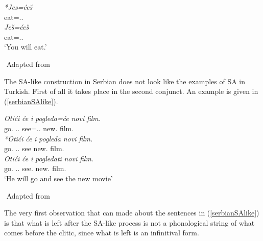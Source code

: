 \begin{exe}
    \ex \label{serbiance2}
    \begin{xlist}
        \ex 
        \gll 
        \textit{*Jes=\'{c}e\u{s}} \\ eat={\Aux}.{\Second}{\Sg}.{\Fut} \\
    
        \ex
        \gll 
        \textit{Je\u{s}=\'{c}e\u{s}} \\ eat={\Aux}.{\Second}{\Sg}.{\Fut} \\
        \glt `You will eat.'
    \end{xlist}
    ${}$ \hfill Adapted from \cite{despic2017suspended}
\end{exe}

The SA-like construction in Serbian does not look like the examples of SA in Turkish. First of all it takes place in the second conjunct. An example is given in (\ref{serbianSAlike}).

\begin{exe}
    \ex \label{serbianSAlike}
    \begin{xlist}
        \ex 
        \gll 
        \textit{Oti\'{c}i} \textit{\'{c}e} \textit{i} \textit{pogleda=\'{c}e} \textit{novi} \textit{film.} \\ go.{\Inf} {\Aux}.{\Third}{\Sg}.{\Fut} {\And} see={\Aux}.{\Third}{\Sg}.{\Fut} new.{\Acc} film.{\Acc} \\
        
        \ex 
        \gll 
        \textit{*Oti\'{c}i} \textit{\'{c}e} \textit{i} \textit{pogleda} \textit{novi} \textit{film.} \\ go.{\Inf} {\Aux}.{\Third}{\Sg}.{\Fut} {\And} see new.{\Acc} film.{\Acc} \\
        
        \ex 
        \gll 
        \textit{Oti\'{c}i} \textit{\'{c}e} \textit{i} \textit{pogledati} \textit{novi} \textit{film.} \\ go.{\Inf} {\Aux}.{\Third}{\Sg}.{\Fut} {\And} see.{\Inf} new.{\Acc} film.{\Acc} \\
        \glt `He will go and see the new movie'
    \end{xlist}
    ${}$ \hfill Adapted from \cite{despic2017suspended}
\end{exe}

The very first observation that can made about the sentences in (\ref{serbianSAlike}) is that what is left after the SA-like process is not a phonological string of what comes before the clitic, since what is left is an infinitival form.


